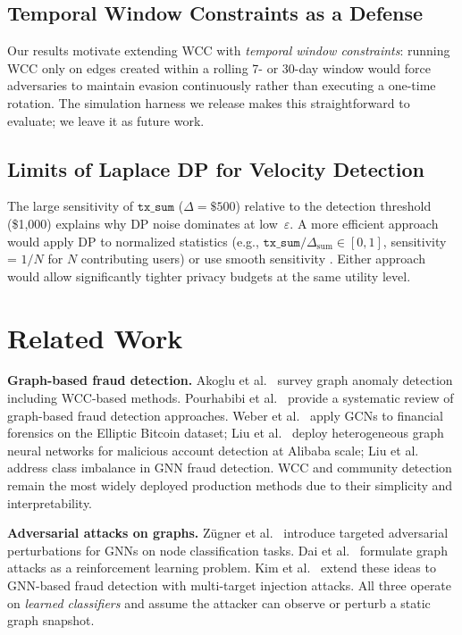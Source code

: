 \documentclass[sigconf,nonacm]{acmart}
\newcommand{\wcc}{\textsc{WCC}\xspace}
\newcommand{\eps}{\varepsilon}
\begin{document}
\subsection{Temporal Window Constraints as a Defense}

Our results motivate extending \wcc with \emph{temporal window constraints}:
running \wcc only on edges created within a rolling 7- or 30-day window
would force adversaries to maintain evasion continuously rather than
executing a one-time rotation.  The simulation harness we release makes this
straightforward to evaluate; we leave it as future work.

\subsection{Limits of Laplace DP for Velocity Detection}

The large sensitivity of $\texttt{tx\_sum}$ ($\Delta = \$500$) relative to
the detection threshold (\$1{,}000) explains why DP noise dominates at
low~$\eps$.  A more efficient approach would apply DP to normalized
statistics (e.g., $\texttt{tx\_sum} / \Delta_{\mathrm{sum}} \in [0,1]$,
sensitivity = $1/N$ for $N$ contributing users) or use smooth sensitivity
\cite{nissim2007}.  Either approach would allow significantly tighter privacy
budgets at the same utility level.

\section{Related Work}

\noindent\textbf{Graph-based fraud detection.}
Akoglu et al.~\cite{akoglu2015} survey graph anomaly detection including
\wcc-based methods.  Pourhabibi et al.~\cite{pourhabibi2020} provide a
systematic review of graph-based fraud detection approaches.  Weber et
al.~\cite{weber2019} apply GCNs to financial forensics on the Elliptic
Bitcoin dataset; Liu et al.~\cite{liu2018heterogeneous} deploy heterogeneous
graph neural networks for malicious account detection at Alibaba scale; Liu
et al.~\cite{liu2021} address class imbalance in GNN fraud detection.  \wcc
and community detection remain the most widely deployed production methods
due to their simplicity and interpretability.

\noindent\textbf{Adversarial attacks on graphs.}
Z\"{u}gner et al.~\cite{zugner2018} introduce targeted adversarial
perturbations for GNNs on node classification tasks.  Dai et
al.~\cite{dai2018} formulate graph attacks as a reinforcement learning
problem.  Kim et al.~\cite{kim2024fraudgangs} extend these ideas to
GNN-based fraud detection with multi-target injection attacks.  All three
operate on \emph{learned classifiers} and assume the attacker can observe
or perturb a static graph snapshot.
\end{document}
